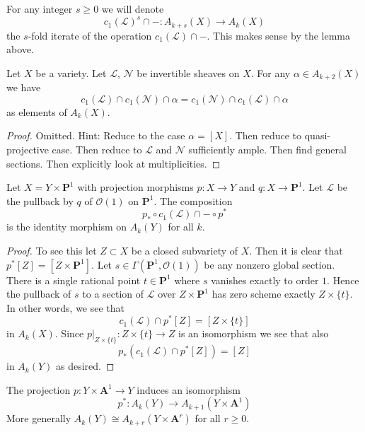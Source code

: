 \noindent
For any integer $s \geq 0$ we will denote
$$
c_1(\mathcal{L})^s \cap - : A_{k + s}(X) \to A_k(X)
$$
the $s$-fold iterate of the operation $c_1(\mathcal{L}) \cap - $.
This makes sense by the lemma above.

\begin{lemma}
\label{lemma-cap-commutative}
Let $X$ be a variety.
Let $\mathcal{L}$, $\mathcal{N}$ be invertible sheaves on $X$.
For any $\alpha \in A_{k + 2}(X)$ we have
$$
c_1(\mathcal{L}) \cap c_1(\mathcal{N}) \cap \alpha
=
c_1(\mathcal{N}) \cap c_1(\mathcal{L}) \cap \alpha
$$
as elements of $A_k(X)$.
\end{lemma}

\begin{proof}
Omitted. Hint: Reduce to the case $\alpha = [X]$.
Then reduce to quasi-projective case. Then reduce to
$\mathcal{L}$ and $\mathcal{N}$ sufficiently ample.
Then find general sections. Then explicitly look at
multiplicities.
\end{proof}

\begin{lemma}
\label{lemma-cap-P1}
Let $X = Y \times \mathbf{P}^1$ with projection morphisms
$p : X \to Y$ and $q : X \to \mathbf{P}^1$.
Let $\mathcal{L}$ be the pullback by $q$ of $\mathcal{O}(1)$ on $\mathbf{P}^1$.
The composition
$$
p_* \circ c_1(\mathcal{L}) \cap - \circ p^*
$$
is the identity morphism on $A_k(Y)$ for all $k$.
\end{lemma}

\begin{proof}
To see this let
$Z \subset X$ be a closed subvariety of $X$. Then it is clear that
$p^*[Z] = [Z \times \mathbf{P}^1]$. Let
$s \in \Gamma(\mathbf{P}^1, \mathcal{O}(1))$ be any nonzero global
section. There is a single rational point $t \in \mathbf{P}^1$
where $s$ vanishes exactly to order $1$. Hence the pullback of
$s$ to a section of $\mathcal{L}$ over $Z \times \mathbf{P}^1$ has
zero scheme exactly $Z \times \{t\}$. In other words, we see that
$$
c_1(\mathcal{L}) \cap p^*[Z] = [Z \times \{t\}]
$$
in $A_k(X)$. Since $p|_{Z \times \{t\}} : Z \times \{t\} \to Z$
is an isomorphism we see that also
$$
p_*(c_1(\mathcal{L}) \cap p^*[Z]) = [Z]
$$
in $A_k(Y)$ as desired.
\end{proof}

\begin{lemma}
\label{lemma-affine-over-variety}
The projection $p : Y \times \mathbf{A}^1 \to Y$ induces an isomorphism
$$
p^* : A_k(Y) \to A_{k + 1}(Y \times \mathbf{A}^1)
$$
More generally $A_k(Y) \cong A_{k + r}(Y \times \mathbf{A}^r)$
for all $r \geq 0$.
\end{lemma}

